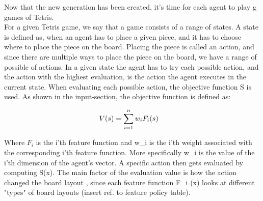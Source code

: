 Now that the new generation has been created, 
it's time for each agent to play g games of Tetris.\\
For a given Tetris game, we say that a game consists 
of a range of states. A state is defined as, when an 
agent has to place a given piece, and it has to choose 
where to place the piece on the board. Placing the 
piece is called an action, and since there are multiple 
ways to place the piece on the board, we have a range 
of possible of actions. In a given state the agent 
has to try each possible action, and the action 
with the highest evaluation, is the action the 
agent executes in the current state. 
When evaluating each possible action, the 
objective function S is used. As shown in the 
input-section, the objective function is 
defined as:

\begin{align*}
V (s ) &= \sum_{i=1}^{n} w _{i}F _{i}(s )
\end{align*}

Where $F_i$ is the i'th feature function 
and w\_i is the i'th weight associated 
with the corresponding i'th feature function. 
More specifically w\_i is the value of 
the i'th dimension of the agent's vector.
A specific action then gets evaluated 
by computing S(x). The main factor of 
the evaluation value is how the action 
changed the board layout , since each 
feature function F\_i (x) looks at different 
"types" of board layouts (insert ref. to feature policy table).
